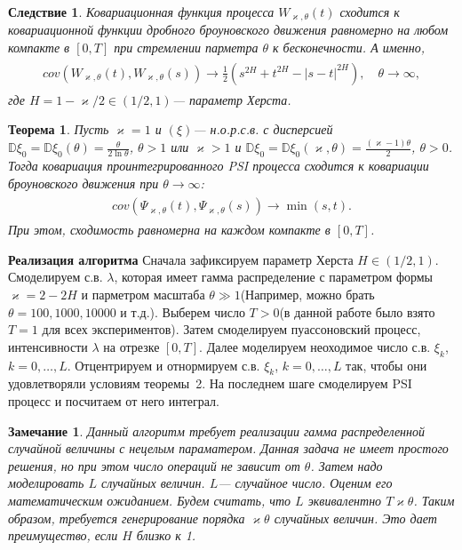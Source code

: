 \documentclass[a4paper,12pt]{article}
\numberwithin{equation}{section}
\newtheorem{Theorem}{Теорема}
\newtheorem{Corollary}{Следствие}
\newtheorem{Remark}{Замечание}
\begin{document}
	\begin{Corollary}
		Ковариационная функция процесса $W_{\varkappa, 
			\theta}(t)$ сходится к ковариационной функции дробного броуновского движения равномерно на любом компакте в $[0,T]$ при стремлении парметра $\theta$ к бесконечности. А именно, 
		\begin{align}
		\begin{split}
		cov(W_{\varkappa, 
			\theta}(t), W_{\varkappa, 
			\theta}(s)) \to \frac{1}{2}(s^{2H} + t^{2H}-|s-t|^{2H}), \quad \theta \to \infty,
		\end{split}
		\end{align} 
		где $H = 1-\varkappa/2 \in (1/2, 1)$--- параметр Херста. 
	\end{Corollary}
	\begin{Theorem}
		Пусть $\varkappa = 1$ и $(\xi)$--- н.о.р.с.в. с дисперсией $\mathbb{D}\xi_0 = \mathbb{D}\xi_0(\theta) = \frac{\theta}{2\ln \theta}$, $\theta>1$ или $\varkappa >1$ и $\mathbb{D}\xi_0 = \mathbb{D}\xi_0(\varkappa, \theta) = \frac{(\varkappa-1)\theta}{2}$, $\theta>0$. Тогда ковариация проинтегрированного PSI процесса сходится к ковариации броуновского движения при $\theta \to \infty$:
		\begin{align}
		\begin{split}
		cov(\Psi_{\varkappa, \theta}(t), \Psi_{\varkappa, \theta}(s)) \to \min(s,t).
		\end{split}
		\end{align}
		При этом, сходимость равномерна на каждом компакте в $[0,T]$. 
	\end{Theorem}
	\textbf{Реализация алгоритма} \quad Сначала зафиксируем параметр Херста $H \in (1/2, 1)$. Смоделируем с.в. $\lambda$, которая имеет гамма распределение с параметром формы $\varkappa = 2-2H$ и парметром масштаба $\theta \gg 1$(Например, можно брать $\theta = 100, 1000, 10000$ и т.д.). Выберем число $T>0$(в данной работе было взято $T = 1$ для всех экспериментов). Затем смоделируем пуассоновский процесс, интенсивности $\lambda$ на отрезке $[0,T]$. Далее моделируем неоходимое число с.в. $\xi_k$, $k =0, \ldots, L$. Отцентрируем и отнормируем с.в. $\xi_k$, $k = 0, \ldots, L$ так, чтобы они удовлетворяли условиям теоремы~2. На последнем шаге смоделируем PSI процесс и посчитаем от него интеграл. 
	\begin{Remark}
		Данный алгоритм требует реализации гамма распределенной случайной величины с нецелым параматером. Данная задача не имеет простого решения, но при этом число операций не зависит от $\theta$. Затем надо моделировать $L$ случайных величин. $L$--- случайное число. Оценим его математическим ожиданием. Будем считать, что $L$ эквивалентно $T\varkappa \theta$. Таким образом, требуется генерирование порядка $\varkappa\theta$ случайных величин. Это дает преимущество, если $H$ близко к 1. 
	\end{Remark}
\end{document}
